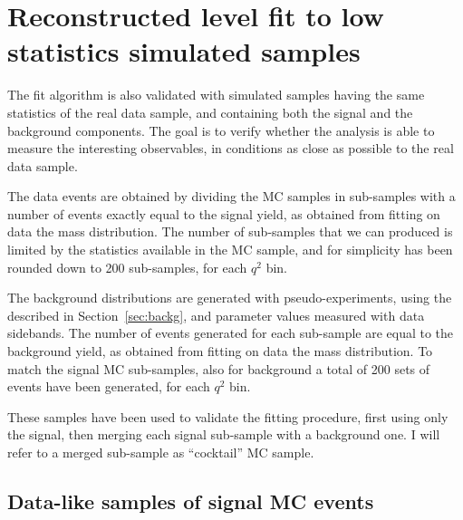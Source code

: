 
\section{Reconstructed level fit to low statistics simulated samples}
\label{sec:datalike-MC}

The fit algorithm is also validated with simulated samples having the same statistics of the real data sample, and containing both the signal and the background components.
The goal is to verify whether the analysis is able to measure the interesting observables, in conditions as close as possible to the real data sample.

The data events are obtained by dividing the MC samples in sub-samples with a number of events exactly equal to the signal yield, as obtained from fitting on data the \PBz mass distribution.
The number of sub-samples that we can produced is limited by the statistics available in the MC sample, and for simplicity has been rounded down to 200 sub-samples, for each $q^2$ bin.

The background distributions are generated with pseudo-experiments, using the \pdf described in Section~\ref{sec:backg}, and parameter values measured with data sidebands.
The number of events generated for each sub-sample are equal to the background yield, as obtained from fitting on data the \PBz mass distribution.
To match the signal MC sub-samples, also for background a total of 200 sets of events have been generated, for each $q^2$ bin.

These samples have been used to validate the fitting procedure, first using only the signal, then merging each signal sub-sample with a background one.
I will refer to a merged sub-sample as ``cocktail'' MC sample.

\subsection{Data-like samples of signal MC events}
\label{sec:Cocktail-MC-pure}

